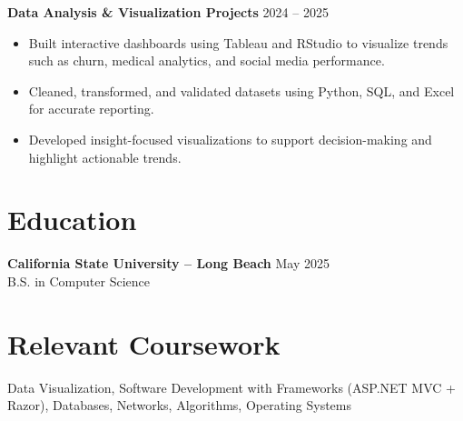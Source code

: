 \documentclass[a4paper,10pt]{article}
\newcommand{\dateright}[1]{\hfill {\small\textnormal{#1}}}
\begin{document}
\textbf{Data Analysis \& Visualization Projects} \dateright{2024 – 2025}
\begin{itemize}
  \item Built interactive dashboards using Tableau and RStudio to visualize trends such as churn, medical analytics, and social media performance.
  \item Cleaned, transformed, and validated datasets using Python, SQL, and Excel for accurate reporting.
  \item Developed insight-focused visualizations to support decision-making and highlight actionable trends.
\end{itemize}

\section*{Education}
\textbf{California State University – Long Beach} \dateright{May 2025}\\
B.S. in Computer Science

\section*{Relevant Coursework}
Data Visualization, Software Development with Frameworks (ASP.NET MVC + Razor), Databases, Networks, Algorithms, Operating Systems

\end{document}
